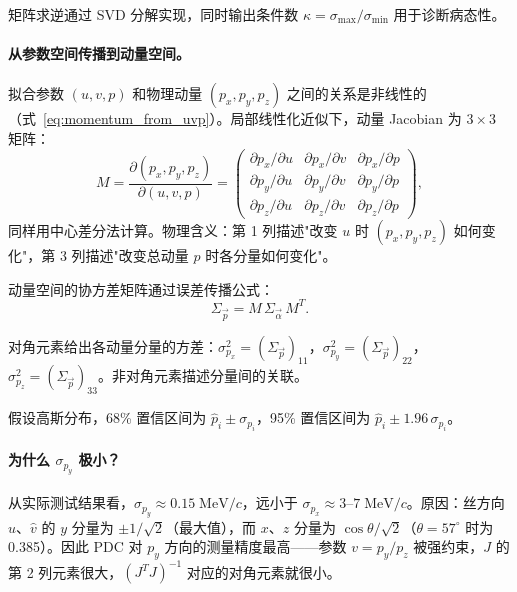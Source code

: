 \documentclass[a4paper, 11pt]{article}
\begin{document}
矩阵求逆通过 SVD 分解实现，同时输出条件数 $\kappa = \sigma_\mathrm{max}/\sigma_\mathrm{min}$ 用于诊断病态性。

\paragraph{从参数空间传播到动量空间。}
拟合参数 $(u, v, p)$ 和物理动量 $(p_x, p_y, p_z)$ 之间的关系是非线性的（式~\eqref{eq:momentum_from_uvp}）。局部线性化近似下，动量 Jacobian 为 $3 \times 3$ 矩阵：
\begin{equation}
  M = \frac{\partial (p_x, p_y, p_z)}{\partial (u, v, p)}
  = \begin{pmatrix}
    \partial p_x/\partial u & \partial p_x/\partial v & \partial p_x/\partial p \\
    \partial p_y/\partial u & \partial p_y/\partial v & \partial p_y/\partial p \\
    \partial p_z/\partial u & \partial p_z/\partial v & \partial p_z/\partial p
  \end{pmatrix},
  \label{eq:momentum_jacobian}
\end{equation}
同样用中心差分法计算。物理含义：第 1 列描述"改变 $u$ 时 $(p_x, p_y, p_z)$ 如何变化"，第 3 列描述"改变总动量 $p$ 时各分量如何变化"。

动量空间的协方差矩阵通过误差传播公式：
\begin{equation}
  \Sigma_{\vec{p}} = M \, \Sigma_{\vec{\alpha}} \, M^T.
  \label{eq:momentum_cov}
\end{equation}

对角元素给出各动量分量的方差：$\sigma_{p_x}^2 = (\Sigma_{\vec{p}})_{11}$，$\sigma_{p_y}^2 = (\Sigma_{\vec{p}})_{22}$，$\sigma_{p_z}^2 = (\Sigma_{\vec{p}})_{33}$。非对角元素描述分量间的关联。

假设高斯分布，68\% 置信区间为 $\hat{p}_i \pm \sigma_{p_i}$，95\% 置信区间为 $\hat{p}_i \pm 1.96\,\sigma_{p_i}$。

\paragraph{为什么 $\sigma_{p_y}$ 极小？}
从实际测试结果看，$\sigma_{p_y} \approx 0.15\;\mathrm{MeV}/c$，远小于 $\sigma_{p_x} \approx 3\text{--}7\;\mathrm{MeV}/c$。原因：丝方向 $\hat{u}$、$\hat{v}$ 的 $y$ 分量为 $\pm 1/\sqrt{2}$（最大值），而 $x$、$z$ 分量为 $\cos\theta/\sqrt{2}$（$\theta = 57^\circ$ 时为 0.385）。因此 PDC 对 $p_y$ 方向的测量精度最高——参数 $v = p_y/p_z$ 被强约束，$J$ 的第 2 列元素很大，$(J^TJ)^{-1}$ 对应的对角元素就很小。
\end{document}

